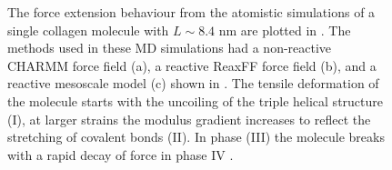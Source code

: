 \begin{figure}[H]
\centering
{}
\hspace{5mm}
\caption{The force extension behaviour from the atomistic simulations of a single collagen molecule with $L \sim 8.4\text{ nm}$ are plotted in .  The methods used in these MD simulations had a non-reactive CHARMM force field (a), a reactive ReaxFF force field (b), and a reactive mesoscale model (c) shown in . The tensile deformation of the molecule starts with the uncoiling of the triple helical structure (I), at larger strains the modulus gradient increases to reflect the stretching of covalent bonds (II). In phase (III) the molecule breaks with a rapid decay of force in phase IV \cite{Buehler2006a, Buehler2007}.} 
\label{fig:buehler_model}
\end{figure}

